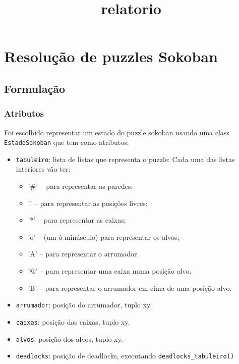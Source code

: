 \documentclass[11pt]{article}
\title{relatorio}
\begin{document}
    
    
    \maketitle
    
    

    
    \hypertarget{resoluuxe7uxe3o-de-puzzles-sokoban}{%
\section{Resolução de puzzles
Sokoban}\label{resoluuxe7uxe3o-de-puzzles-sokoban}}

    \hypertarget{formulauxe7uxe3o}{%
\subsection{Formulação}\label{formulauxe7uxe3o}}

\hypertarget{atributos}{%
\subsubsection{Atributos}\label{atributos}}

Foi escolhido representar um estado do puzzle sokoban usando uma class
\texttt{EstadoSokoban} que tem como atributos:

\begin{itemize}
\item
  \texttt{tabuleiro}: lista de listas que representa o puzzle: Cada uma
  das listas interiores vão ter:

  \begin{itemize}
  \item
    '\#' -- para representar as paredes;
  \item
    '.' -- para representar as posições livres;
  \item
    '*' -- para representar as caixas;
  \item
    'o' -- (um ó minúsculo) para representar os alvos;
  \item
    'A' -- para representar o arrumador.
  \item
    '@' -- para representar uma caixa numa posição alvo.
  \item
    'B' -- para representar o arrumador em cima de uma posição alvo.
  \end{itemize}
\item
  \texttt{arrumador}: posição do arrumador, tuplo xy.
\item
  \texttt{caixas}: posição das caixas, tuplo xy.
\item
  \texttt{alvos}: posição dos alvos, tuplo xy.
\item
  \texttt{deadlocks}: posição de deadlocks, executando
  \texttt{deadlocks\_tabuleiro()}
\end{itemize}
\end{document}
